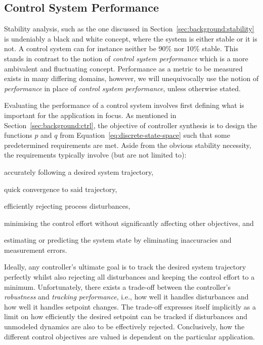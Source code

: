 \subsection{Control System Performance}%
\label{sec:background:performance}%
%
Stability analysis, such as the one discussed in Section~\ref{sec:background:stability} is undeniably a black and white concept, where the system is either stable or it is not.
A control system can for instance neither be 90\% nor 10\% stable.
This stands in contrast to the notion of \emph{control system performance} which is a more ambivalent and fluctuating concept.
Performance as a metric to be measured exists in many differing domains, however, we will unequivocally use the notion of \emph{performance} in place of \emph{control system performance}, unless otherwise stated.

Evaluating the performance of a control system involves first defining what is important for the application in focus.
As mentioned in Section~\ref{sec:background:ctrl}, the objective of controller synthesis is to design the functions $p$ and $q$ from Equation~\eqref{eq:discrete-state-space} such that some predetermined requirements are met.
Aside from the obvious stability necessity, the requirements typically involve (but are not limited to):
%
\begin{enumerate*}[label=(\roman*)]
    \item accurately following a desired system trajectory,
    \item quick convergence to said trajectory,
    \item efficiently rejecting process disturbances,
    \item minimising the control effort without significantly affecting other objectives, and
    \item estimating or predicting the system state by eliminating inaccuracies and measurement errors.
\end{enumerate*}
%
Ideally, any controller's ultimate goal is to track the desired system trajectory perfectly whilst also rejecting all disturbances and keeping the control effort to a minimum.
Unfortunately, there exists a trade-off between the controller's \emph{robustness} and \emph{tracking performance}, i.e., how well it handles disturbances and how well it handles setpoint changes.
The trade-off expresses itself implicitly as a limit on how efficiently the desired setpoint can be tracked if disturbances and unmodeled dynamics are also to be effectively rejected.
Conclusively, how the different control objectives are valued is dependent on the particular application.

